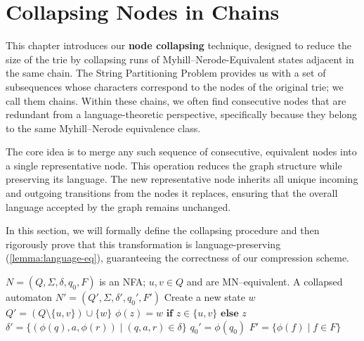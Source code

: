 \section{Collapsing Nodes in Chains} \label{sec:collapsing}
This chapter introduces our \textbf{node collapsing} technique, designed to reduce the size of the trie by collapsing runs of Myhill--Nerode-Equivalent states adjacent in the same chain. The String Partitioning Problem provides us with a set of subsequences whose characters correspond to the nodes of the original trie; we call them chains. Within these chains, we often find consecutive nodes that are redundant from a language-theoretic perspective, specifically because they belong to the same Myhill--Nerode equivalence class.

The core idea is to merge any such sequence of consecutive, equivalent nodes into a single representative node. This operation reduces the graph structure while preserving its language. The new representative node inherits all unique incoming and outgoing transitions from the nodes it replaces, ensuring that the overall language accepted by the graph remains unchanged.

In this section, we will formally define the collapsing procedure and then rigorously prove that this transformation is language-preserving (\cref{lemma:language-eq}), guaranteeing the correctness of our compression scheme.

\begin{algorithm}[H]
\caption{$\textsc{Collapse}(N,u,v)$}
\label{alg:collapse}
\begin{algorithmic}[1]
\Require $N = (Q, \Sigma, \delta, q_0, F)$ is an NFA; $u,v \in Q$ and are MN--equivalent.
\Ensure A collapsed automaton $N'=(Q', \Sigma, \delta', q_0', F')$
    \State Create a new state $w$
    \State $Q' = (Q \setminus \{u,v\})\cup\{w\}$
    \State $\phi(z) = w \textbf{ if } z\in\{u, v\} \textbf{ else } z$
    \State $\delta' = \{ (\phi(q), a, \phi(r)) \mid (q, a, r) \in \delta \}$
    \State $q_0' = \phi(q_0)$
    \State $F' = \{ \phi(f) \mid f \in F \}$
\end{algorithmic}
\end{algorithm}


